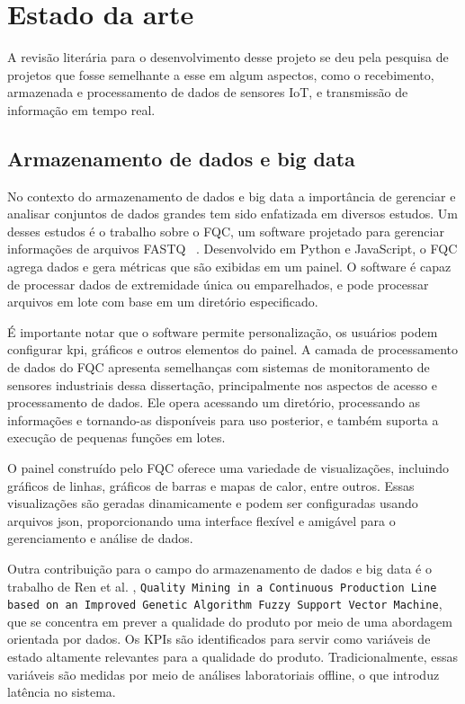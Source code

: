 \chapter{Estado da arte}\label{cap:conceptual}

A revisão literária para o desenvolvimento desse projeto se deu pela pesquisa de projetos que fosse semelhante a esse em algum aspectos, como o recebimento, armazenada e processamento de dados de sensores \gls{IoT}, e transmissão de informação em tempo real.

\section{Armazenamento de dados e big data}


No contexto do armazenamento de dados e big data a importância de gerenciar e analisar conjuntos de dados grandes tem sido enfatizada em diversos estudos. Um desses estudos é o trabalho sobre o \gls{FQC}, um software projetado para gerenciar informações de arquivos FASTQ ~\cite{fqc2017}. Desenvolvido em Python e JavaScript, o \gls{FQC} agrega dados e gera métricas que são exibidas em um painel. O software é capaz de processar dados de extremidade única ou emparelhados, e pode processar arquivos em lote com base em um diretório especificado.

É importante notar que o software permite personalização, os usuários podem configurar \gls{kpi}, gráficos e outros elementos do painel. A camada de processamento de dados do \gls{FQC} apresenta semelhanças com sistemas de monitoramento de sensores industriais dessa dissertação, principalmente nos aspectos de acesso e processamento de dados. Ele opera acessando um diretório, processando as informações e tornando-as disponíveis para uso posterior, e também suporta a execução de pequenas funções em lotes.


O painel construído pelo FQC oferece uma variedade de visualizações, incluindo gráficos de linhas, gráficos de barras e mapas de calor, entre outros. Essas visualizações são geradas dinamicamente e podem ser configuradas usando arquivos \gls{json}, proporcionando uma interface flexível e amigável para o gerenciamento e análise de dados.

Outra contribuição para o campo do armazenamento de dados e big data é o trabalho de Ren et al. \cite{ren2021data}, \texttt{Quality Mining in a Continuous Production Line based on an Improved Genetic Algorithm Fuzzy Support Vector Machine}, que se concentra em prever a qualidade do produto por meio de uma abordagem orientada por dados. Os \gls{KPIs} são identificados para servir como variáveis de estado altamente relevantes para a qualidade do produto. Tradicionalmente, essas variáveis são medidas por meio de análises laboratoriais offline, o que introduz latência no sistema.


